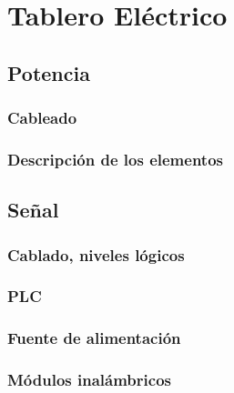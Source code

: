 \chapter{Tablero Eléctrico}
\label{ch:tablero}

\section{Potencia}
\label{sec:Potencia}
\subsection{Cableado}
\subsection{Descripción de los elementos}

\section{Señal}
\label{sec:Senal}

\subsection{Cablado, niveles lógicos}
\subsection{PLC}
\label{subsec:plc}
\subsection{Fuente de alimentación}
\subsection{Módulos inalámbricos}
\label{subsec:inalambrico}
